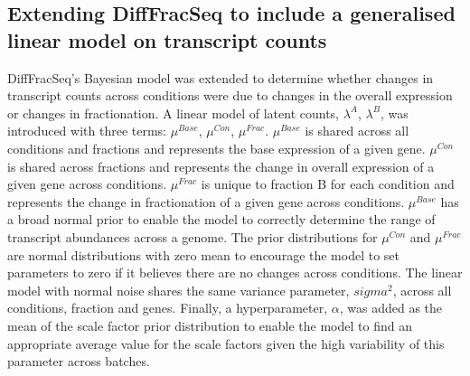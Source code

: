 \documentclass[../main.tex]{subfiles}
\begin{document}
\subsection{Extending DiffFracSeq to include a generalised linear model on transcript counts}

DiffFracSeq's Bayesian model was extended to determine whether changes in transcript counts across conditions were due to changes in the overall expression or changes in fractionation.   
A linear model of latent counts, $\lambda^A$, $\lambda^B$, was introduced with three terms: $\mu^{Base}$, $\mu^{Con}$, $\mu^{Frac}$.
$\mu^{Base}$ is shared across all conditions and fractions and represents the base expression of a given gene.
$\mu^{Con}$ is shared across fractions and represents the change in overall expression of a given gene across conditions.
$\mu^{Frac}$ is unique to fraction B for each condition and represents the change in fractionation of a given gene across conditions.
$\mu^{Base}$ has a broad normal prior to enable the model to correctly determine the range of transcript abundances across a genome.
The prior distributions for $\mu^{Con}$ and $\mu^{Frac}$ are normal distributions with zero mean to encourage the model to set parameters to zero if it believes there are no changes across conditions.
The linear model with normal noise shares the same variance parameter, $sigma^2$, across all conditions, fraction and genes.
Finally, a hyperparameter, $\alpha$, was added as the mean of the scale factor prior distribution to enable the model to find an appropriate average value for the scale factors given the high variability of this parameter across batches.
\end{document}
